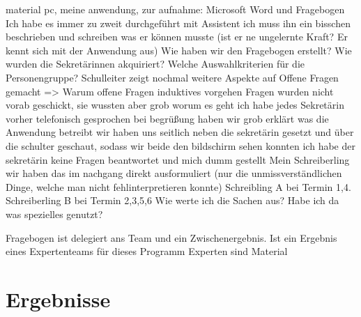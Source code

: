 material
pc, meine anwendung, 
zur aufnahme: Microsoft Word und Fragebogen
Ich habe es immer zu zweit durchgeführt mit Assistent
ich muss ihn ein bisschen beschrieben und schreiben was er können musste (ist er ne ungelernte Kraft? Er kennt sich mit der Anwendung aus)
Wie haben wir den Fragebogen erstellt? 
Wie wurden die Sekretärinnen akquiriert?
Welche Auswahlkriterien für die Personengruppe?
Schulleiter zeigt nochmal weitere Aspekte auf
Offene Fragen gemacht => Warum offene Fragen
induktives vorgehen
Fragen wurden nicht vorab geschickt, sie wussten aber grob worum es geht
ich habe jedes Sekretärin vorher telefonisch gesprochen
bei begrüßung haben wir grob erklärt was die Anwendung betreibt 
wir haben uns seitlich neben die sekretärin gesetzt und über die schulter geschaut, sodass wir beide den bildschirm sehen konnten
ich habe der sekretärin keine Fragen beantwortet und mich dumm gestellt
Mein Schreiberling wir haben das im nachgang direkt ausformuliert (nur die unmissverständlichen Dinge, welche man nicht fehlinterpretieren konnte)
Schreibling A bei Termin 1,4. Schreiberling B bei Termin 2,3,5,6
Wie werte ich die Sachen aus? Habe ich da was spezielles genutzt? 


Fragebogen ist delegiert ans Team und ein Zwischenergebnis. Ist ein Ergebnis eines Expertenteams für dieses Programm
Experten sind Material






















\section{Ergebnisse}
%

